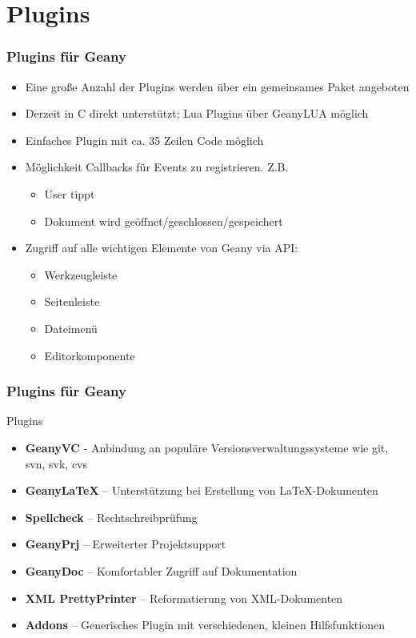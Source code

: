 \section{Plugins}
\begin{frame}
  \frametitle{Plugins für Geany}
  \begin{block}{}
    \begin{itemize}
    \item Eine große Anzahl der Plugins werden über ein gemeinsames
      Paket angeboten
    \item Derzeit in C direkt unterstützt; Lua Plugins über GeanyLUA
      möglich
    \item Einfaches Plugin mit ca. 35 Zeilen Code möglich
    \item Möglichkeit Callbacks für Events zu registrieren. Z.B.
      \begin{itemize}
      \item User tippt
      \item Dokument wird geöffnet/geschlossen/gespeichert
      \end{itemize}
    \item Zugriff auf alle wichtigen Elemente von Geany via API:
      \begin{itemize}
      \item Werkzeugleiste
      \item Seitenleiste
      \item Dateimenü
      \item Editorkomponente
      \end{itemize}
    \end{itemize}
  \end{block}
\end{frame}

\begin{frame}
  \frametitle{Plugins für Geany}
  \begin{block}{Plugins}
    \begin{itemize}
    \item \textbf{GeanyVC} - Anbindung an populäre
        Versions\-ver\-waltungs\-systeme wie git, svn, svk, cvs
    \item \textbf{GeanyLaTeX} -- Unterstützung bei Erstellung von
        \LaTeX-Dokumenten
    \item \textbf{Spellcheck} -- Rechtschreibprüfung
    \item \textbf{GeanyPrj} -- Erweiterter Projektsupport
    \item \textbf{GeanyDoc} -- Komfortabler Zugriff auf Dokumentation
    \item \textbf{XML PrettyPrinter} -- Reformatierung von XML-Dokumenten
    \item \textbf{Addons} -- Generisches Plugin mit verschiedenen, 
        kleinen Hilfsfunktionen
    \end{itemize}
  \end{block}
\end{frame}

